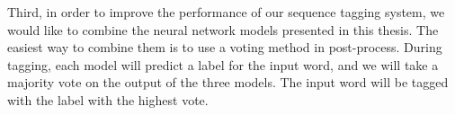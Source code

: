 \documentclass{sfuthesis}
\begin{document}
Third, in order to improve the performance of our sequence tagging system, we would like to combine the neural network models presented in this thesis. The easiest way to combine them is to use a voting method in post-process. During tagging, each model will predict a label for the input word, and we will take a majority vote on the output of the three models. The input word will be tagged with the label with the highest vote.


%
%
%
%
%

\cleardoublepage
{}
{}
%


	

\end{document}

